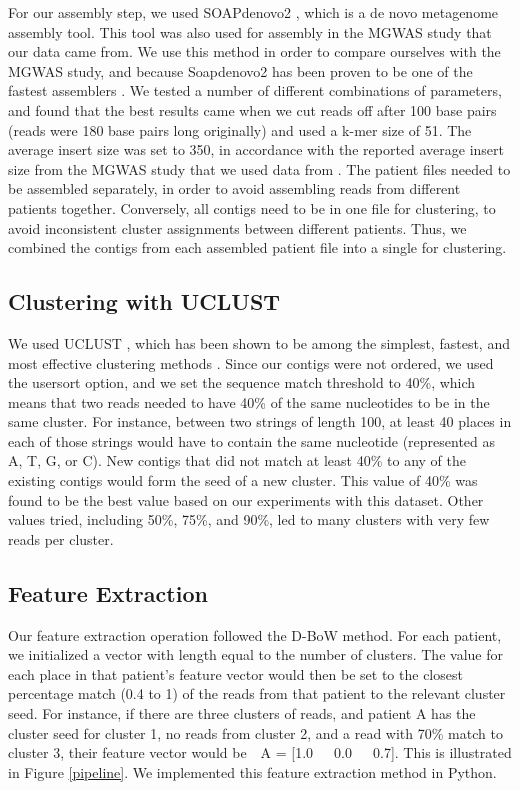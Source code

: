 For our assembly step, we used SOAPdenovo2 \cite{luo12}, which is a de novo metagenome assembly tool. This tool was also used for assembly in the MGWAS study that our data came from. We use this method in order to compare ourselves with the MGWAS study, and because Soapdenovo2 has been proven to be one of the fastest assemblers \cite{peng12}. We tested a number of different combinations of parameters, and found that the best results came when we cut reads off after 100 base pairs (reads were 180 base pairs long originally) and used a k-mer size of 51. The average insert size was set to 350, in accordance with the reported average insert size from the MGWAS study that we used data from \cite{qin041012}. The patient files needed to be assembled separately, in order to avoid assembling reads from different patients together. Conversely, all contigs need to be in one file for clustering, to avoid inconsistent cluster assignments between different patients. Thus, we combined the contigs from each assembled patient file into a single for clustering.

\subsection{Clustering with UCLUST}

We used UCLUST \cite{Edgar10}, which has been shown to be among the simplest, fastest, and most effective clustering methods \cite{bonder090112, sun042711}. Since our contigs were not ordered, we used the usersort option, and we set the sequence match threshold to 40\%, which means that two reads needed to have 40\% of the same nucleotides to be in the same cluster. For instance, between two strings of length 100, at least 40 places in each of those strings would have to contain the same nucleotide (represented as A, T, G, or C). New contigs that did not match at least 40\% to any of the existing contigs would form the seed of a new cluster. This value of 40\% was found to be the best value based on our experiments with this dataset. Other values tried, including 50\%, 75\%, and 90\%, led to many clusters with very few reads per cluster.

\subsection{Feature Extraction}

Our feature extraction operation followed the D-BoW method. For each patient, we initialized a vector with length equal to the number of clusters. The value for each place in that patient's feature vector would then be set to the closest percentage match (0.4 to 1) of the reads from that patient to the relevant cluster seed. For instance, if there are three clusters of reads, and patient A has the cluster seed for cluster 1, no reads from cluster 2, and a read with 70\% match to cluster 3, their feature vector would be~~A = [1.0~~~0.0~~~0.7]. This is illustrated in Figure \ref{pipeline}. We implemented this feature extraction method in Python.

